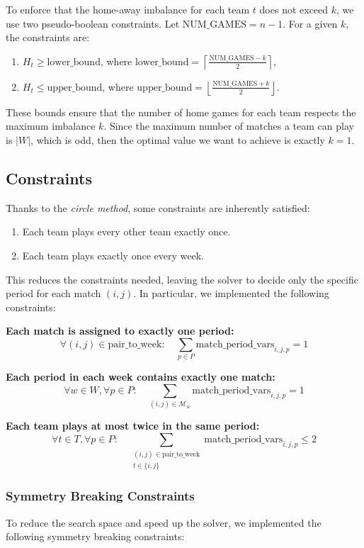 To enforce that the home-away imbalance for each team $t$ does not exceed $k$, we use two pseudo-boolean constraints. Let $\text{NUM\_GAMES} = n-1$. For a given $k$, the constraints are:
\begin{enumerate}
    \item $H_t \ge \text{lower\_bound}$, where $\text{lower\_bound} = \left\lceil \frac{\text{NUM\_GAMES} - k}{2} \right\rceil$,
    \item $H_t \le \text{upper\_bound}$, where $\text{upper\_bound} = \left\lfloor \frac{\text{NUM\_GAMES} + k}{2} \right\rfloor$.
\end{enumerate}
These bounds ensure that the number of home games for each team respects the maximum imbalance $k$. Since the maximum number of matches a team can play is $|W|$, which is odd, then the optimal value we want to achieve is exactly $k=1$.

\subsection{Constraints}
Thanks to the \emph{circle method}, some constraints are inherently satisfied:
\begin{enumerate}
    \item Each team plays every other team exactly once.
    \item Each team plays exactly once every week.
\end{enumerate}
This reduces the constraints needed, leaving the solver to decide only the specific period for each match $(i,j)$. In particular, we implemented the following constraints:

\textbf{Each match is assigned to exactly one period:}
\[
\forall (i,j) \in \text{pair\_to\_week}: \quad \sum_{p \in P} \text{match\_period\_vars}_{i,j,p} = 1
\]

\textbf{Each period in each week contains exactly one match:}
\[
\forall w \in W, \forall p \in P: \quad \sum_{(i,j) \in \mathcal{M}_w} \text{match\_period\_vars}_{i,j,p} = 1
\]

\textbf{Each team plays at most twice in the same period:}
\[
\forall t \in T, \forall p \in P: \quad \sum_{\substack{(i,j) \in \text{pair\_to\_week} \\ t \in \{i,j\}}} \text{match\_period\_vars}_{i,j,p} \leq 2
\]

\subsubsection*{Symmetry Breaking Constraints}
To reduce the search space and speed up the solver, we implemented the following symmetry breaking constraints:

